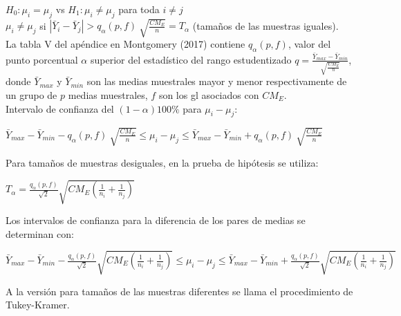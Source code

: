 $H_{0}:\mu_{i} = \mu_{j}$ vs $H_{1}:\mu_{i} \neq \mu_{j}$ para toda $i \neq j$\\

 $\mu_{i} \neq \mu_{j}$ si $| \bar{Y}_{i} -\bar{Y}_{j} | > q_{\alpha} (p,f) \: \sqrt{\frac{CM_{E}}{n}} = T_{\alpha}$ (tamaños de las muestras iguales).\\
 

La tabla V del apéndice en Montgomery (2017) contiene $q_{\alpha} (p,f)$, valor del punto porcentual $\alpha$ superior del estadístico del rango estudentizado $q=\frac{ \bar{Y}_{max} -\bar{Y}_{min}}{ \sqrt{\frac{CM_{E}}{n}}}$, donde $\bar{Y}_{max}$ y $\bar{Y}_{min}$ son las medias muestrales mayor y menor respectivamente de un grupo de $p$ medias muestrales, $f$ son los gl asociados con $CM_{E}$.\\
 
Intervalo de confianza del  $(1-\alpha)100\%$ para $\mu_{i} - \mu_{j}$:\\
 
\begin{center}
	$ \bar{Y}_{max} -\bar{Y}_{min} -  q_{\alpha} (p,f) \: \sqrt{\frac{CM_{E}}{n}} \leq \mu_{i} - \mu_{j} \leq \bar{Y}_{max} -\bar{Y}_{min} + q_{\alpha} (p,f) \: \sqrt{\frac{CM_{E}}{n}} $ \\
\end{center}

Para tamaños de muestras desiguales, en la prueba de hipótesis se utiliza:\\

\begin{center}
	$ T_{\alpha} = \frac{q_{\alpha} (p,f)}{\sqrt{2}} \sqrt{CM_{E} (\frac{1}{n_{i}} + \frac{1}{n_{j}})}  $ \\
\end{center}


Los intervalos de confianza para la diferencia de los pares de medias se determinan con:\\


\begin{center}
	$ \bar{Y}_{max} -\bar{Y}_{min} -  \frac{q_{\alpha} (p,f)}{\sqrt{2}} \sqrt{CM_{E} (\frac{1}{n_{i}} + \frac{1}{n_{j}})}  \leq \mu_{i} - \mu_{j} \leq \bar{Y}_{max} -\bar{Y}_{min} + \frac{q_{\alpha} (p,f)}{\sqrt{2}} \sqrt{CM_{E} (\frac{1}{n_{i}} + \frac{1}{n_{j}})}  $ \\
\end{center}

A la versión para tamaños de las muestras diferentes se llama el procedimiento de Tukey-Kramer.
